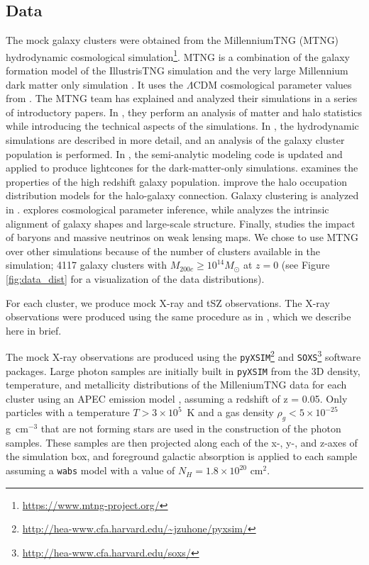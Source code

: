 \documentclass[twocolumn, linenumbers, 11pt]{aastex63}%
\begin{document}
\subsection{Data}\label{data}
The mock galaxy clusters were obtained from the MillenniumTNG (MTNG) hydrodynamic cosmological simulation\footnote{\url{https://www.mtng-project.org/}}. MTNG is a combination of the galaxy formation model of the IllustrisTNG simulation \citep{Nelson_2018, Pillepich_2018} and the very large Millennium dark matter only simulation \citep{Springel_2005}. It uses the $\Lambda$CDM cosmological parameter values from \citet{Planck_2015_Values}. The MTNG team has explained and analyzed their simulations in a series of introductory papers. In \citet{MTNG_1}, they perform an analysis of matter and halo statistics while introducing the technical aspects of the simulations. In \citet{MTNG_2}, the hydrodynamic simulations are described in more detail, and an analysis of the galaxy cluster population is performed. In \citet{MTNG_3}, the semi-analytic modeling code is updated and applied to produce lightcones for the dark-matter-only simulations. \citet{MTNG_4} examines the properties of the high redshift galaxy population. \citet{MTNG_6, MTNG_5} improve the halo occupation distribution models for the halo-galaxy connection. Galaxy clustering is analyzed in \citet{MTNG_7}. 
\citet{MTNG_8} explores cosmological parameter inference, while \citet{MTNG_9} analyzes the intrinsic alignment of galaxy shapes and large-scale structure. Finally, \citet{MTNG_10} studies the impact of baryons and massive neutrinos on weak lensing maps. We chose to use MTNG over other simulations because of the number of clusters available in the simulation; 4117 galaxy clusters with $M_{200c} \geq 10^{14} M_{\odot}$ at $z=0$ (see Figure \ref{fig:data_dist} for a visualization of the data distributions). 

For each cluster, we produce mock X-ray and tSZ observations. The X-ray observations were produced using the same procedure as in \citet{Ntampaka2019}, which we describe here in brief. 

The mock X-ray observations are produced using the \texttt{pyXSIM}\footnote{\url{http://hea-www.cfa.harvard.edu/~jzuhone/pyxsim/}} \citep{ZuHone2014} and \texttt{SOXS}\footnote{\url{http://hea-www.cfa.harvard.edu/soxs/}} software packages. Large photon samples are initially built in \texttt{pyXSIM} from the 3D density, temperature, and metallicity distributions of the MilleniumTNG data for each cluster using an APEC emission model \citep{Foster2012}, assuming a redshift of z = 0.05. Only particles with a temperature $T > 3 \times 10^5$~K and a gas density $\rho_g < 5 \times 10^{-25}$ g~cm$^{-3}$ that are not forming stars are used in the construction of the photon samples. These samples are then projected along each of the x-, y-, and z-axes of the simulation box, and foreground galactic absorption is applied to each sample assuming a \texttt{wabs} model \citep{wabs} with a value of $N_H = 1.8 \times 10^{20}$ cm$^2$.
\end{document}
